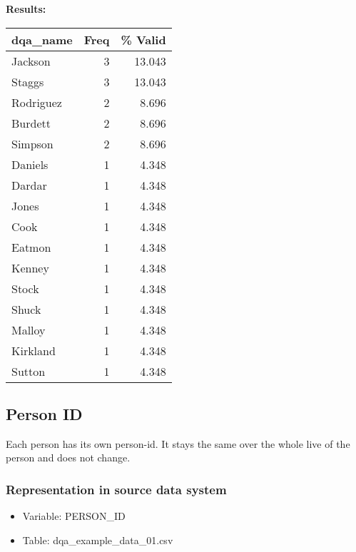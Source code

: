 \documentclass[
]{article}
\providecommand{\tightlist}{%
  \setlength{\itemsep}{0pt}\setlength{\parskip}{0pt}}
\begin{document}
\textbf{Results:}\\

\begin{table}[H]
\centering
\begin{tabular}{l|r|r}
\hline
\textbf{dqa\_name} & \textbf{Freq} & \textbf{\% Valid}\\
\hline
Jackson & 3 & 13.043\\
\hline
Staggs & 3 & 13.043\\
\hline
Rodriguez & 2 & 8.696\\
\hline
Burdett & 2 & 8.696\\
\hline
Simpson & 2 & 8.696\\
\hline
Daniels & 1 & 4.348\\
\hline
Dardar & 1 & 4.348\\
\hline
Jones & 1 & 4.348\\
\hline
Cook & 1 & 4.348\\
\hline
Eatmon & 1 & 4.348\\
\hline
Kenney & 1 & 4.348\\
\hline
Stock & 1 & 4.348\\
\hline
Shuck & 1 & 4.348\\
\hline
Malloy & 1 & 4.348\\
\hline
Kirkland & 1 & 4.348\\
\hline
Sutton & 1 & 4.348\\
\hline
\end{tabular}
\end{table}
\newpage

\hypertarget{person-id}{%
\subsection{Person ID}\label{person-id}}

Each person has its own person-id. It stays the same over the whole live
of the person and does not change.

\hypertarget{representation-in-source-data-system-10}{%
\subsubsection{\texorpdfstring{Representation in \textbf{source} data
system}{Representation in source data system}}\label{representation-in-source-data-system-10}}

\begin{itemize}
\tightlist
\item
  Variable: PERSON\_ID
\item
  Table: dqa\_example\_data\_01.csv
\end{itemize}
\end{document}
